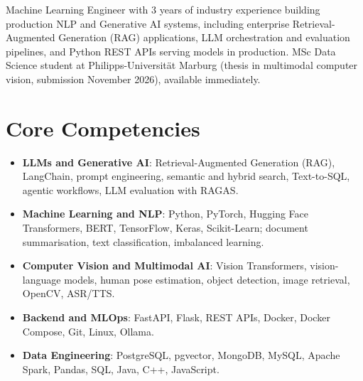 \documentclass[11pt,a4paper,sans]{moderncv}
\begin{document}
\makecvtitle


\vspace{6pt}
\small{Machine Learning Engineer with 3 years of industry experience building production NLP and Generative AI systems, including enterprise Retrieval-Augmented Generation (RAG) applications, LLM orchestration and evaluation pipelines, and Python REST APIs serving models in production. MSc Data Science student at Philipps-Universität Marburg (thesis in multimodal computer vision, submission November 2026), available immediately.}


\section{Core Competencies}
\vspace{1pt}
\begin{itemize}

\item \textbf{LLMs and Generative AI}: Retrieval-Augmented Generation (RAG), LangChain, prompt engineering, semantic and hybrid search, Text-to-SQL, agentic workflows, LLM evaluation with RAGAS.

\item \textbf{Machine Learning and NLP}: Python, PyTorch, Hugging Face Transformers, BERT, TensorFlow, Keras, Scikit-Learn; document summarisation, text classification, imbalanced learning.

\item \textbf{Computer Vision and Multimodal AI}: Vision Transformers, vision-language models, human pose estimation, object detection, image retrieval, OpenCV, ASR/TTS.

\item \textbf{Backend and MLOps}: FastAPI, Flask, REST APIs, Docker, Docker Compose, Git, Linux, Ollama.

\item \textbf{Data Engineering}: PostgreSQL, pgvector, MongoDB, MySQL, Apache Spark, Pandas, SQL, Java, C++, JavaScript.

\end{itemize}

\end{document}
